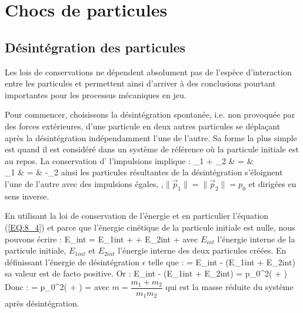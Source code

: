 \chapter{Chocs de particules}

\section{D\'esint\'egration des particules}

Les lois de conservations ne d\'ependent absolument pas de l'esp\`ece d'interaction entre les particules et permettent ainsi d'arriver \`a des conclusions pourtant importantes pour les processus m\'ecaniques en jeu.

Pour commencer, choisissons la d\'esint\'egration spontan\'ee, i.e. non provoqu\'ee par des forces ext\'erieures, d'une particule en deux autres particules se d\'epla\c{c}ant apr\`es la d\'esint\'egration ind\'ependamment l'une de l'autre. Sa forme la plus simple est quand il est consid\'er\'e dans un syst\`eme de r\'ef\'erence o\`u la particule initiale est au repos. La conservation d' l'impulsions implique :
\bea
	_{1} + _{2} & = &  \nonumber \\
	_{1} & = & -_{2}
\eea
ainsi les particules r\'esultantes de la d\'esint\'egration s'\'eloignent l'une de l'autre avec des impulsions \'egales, ,$\lVert \vec{p}_{1} \rVert = \lVert \vec{p}_{2} \rVert = p_{0}$ et dirig\'ees en sens inverse.

En utilisant la loi de conservation de l'\'energie et en particulier l'\'equation (\ref{EQ:8_4}) et parce que l'\'energie cin\'etique de la particule initiale est nulle, nous pouvons \'ecrire :
\be
	E_{int} = E_{1int} +  + E_{2int} + 
\ee
avec $E_{int}$ l'\'energie interne de la particule initiale, $E_{1int}$ et $E_{2int}$ l'\'energie interne des deux particules cr\'e\'ees. En d\'efinissant l'\'energie de d\'esint\'egration $\epsilon$ telle que :
\be
	\epsilon = E_{int} - (E_{1int} + E_{2int}) \label{EQ:16_1}
\ee
sa valeur est de facto positive. Or :
\be
	E_{int} - (E_{1int} + E_{2int}) = p_{0}^{2}\left( + \right)
\ee
Donc :
\be
	\epsilon = p_{0}^{2}\left( + \right) =  \label{EQ:16_2}
\ee
avec $m = \dfrac{m_{1} + m_{2}}{m_{1}m_{2}}$ qui est la masse r\'eduite du syst\`eme apr\`es d\'esint\'egration.

